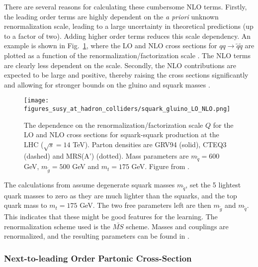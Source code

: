 \documentclass[twoside,english]{uiofysmaster}
\begin{document}
{There are several reasons for calculating these cumbersome NLO terms. Firstly, the leading order terms are highly dependent on the \textit{a priori} unknown renormalization scale, leading to a large uncertainty in theoretical predictions (up to a factor of two). Adding higher order terms reduces this scale dependency. An example is shown in Fig.~\ref{Fig:: hadron susy : LO vs NLO beenakker}, where the LO and NLO cross sections for $qq \rightarrow \widetilde{q} \widetilde{q}$ are plotted as a function of the renormalization/factorization scale \cite{beenakker1997squark}. The NLO terms are clearly less dependent on the scale.  Secondly, the NLO contributions are expected to be large and positive, thereby raising the cross sections significantly and allowing for stronger bounds on the gluino and squark masses \cite{beenakker1997squark}.

\begin{figure}
\centering
\texttt{[image: figures\_susy\_at\_hadron\_colliders/squark\_gluino\_LO\_NLO.png]}
\caption{The dependence on the renormalization/factorization scale $Q$ for the LO and NLO cross sections for squark-squark production at the LHC ($\sqrt{s}=14$ TeV). Parton densities are GRV94 (solid), CTEQ3 (dashed) and MRS(A') (dotted). Mass parameters are $m_{\widetilde{q}}=600$ GeV, $m_{\widetilde{g}}=500$ GeV and $m_t=175$ GeV. Figure from \cite{beenakker1997squark}.}
\label{Fig:: hadron susy : LO vs NLO beenakker}
\end{figure}


The calculations from \cite{beenakker1997squark} assume degenerate squark masses $m_{\widetilde{q}}$, set the 5 lightest quark masses to zero as they are much lighter than the squarks, and the top quark mass to $m_t =175$ GeV. The two free parameters left are then $m_{\widetilde{g}}$ and $m_{\widetilde{q}}$. This indicates that these might be good features for the learning. The renormalization scheme used is the $\bar{MS}$ scheme. Masses and couplings are renormalized, and the resulting parameters can be found in \cite{beenakker1997squark}.

\subsubsection{Next-to-leading Order Partonic Cross-Section}

}
\end{document}
